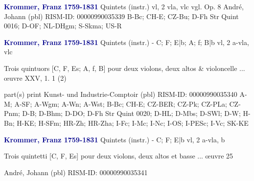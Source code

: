 \documentclass[twocolumn]{book}
\begin{document}
\newline \par \vspace{7pt} \textcolor{darkblue}{\textbf{Krommer, Franz  1759-1831}}
\newline Quintets (instr.)
 vl, 2 vla, vlc
\newline vgl. Op. 8
\newline André, Johann  (pbl)
\newline RISM-ID: 00000990035339
\newline B-Bc; CH-E; CZ-Bu; D-Fh  Str Quint 0016; D-OF; NL-DHgm; S-Skma; US-R
\newline \par \vspace{7pt} \textcolor{darkblue}{\textbf{Krommer, Franz  1759-1831}}
\newline Quintets (instr.) - C; F; E|b; A; f; B|b
 vl, 2 a-vla, vlc
\newline \begin{itshape}Trois quintuors [C, F, Es; A, f, B] pour deux violons, deux altos \& violoncelle ... œuvre XXV, 1. 1 (2)\end{itshape} 
\newline \textcolor{darkblue}{}  part(s)
\newline print
\newline Kunst- und Industrie-Comptoir  (pbl)
\newline RISM-ID: 00000990035340
\newline A-M; A-SF; A-Wgm; A-Wn; A-Wst; B-Bc; CH-E; CZ-BER; CZ-Pk; CZ-PLa; CZ-Pnm; D-B; D-Bhm; D-DO; D-Fh  Str Quint 0020; D-HL; D-Mbs; D-SWl; D-W; H-Bn; H-KE; H-SFm; HR-Zh; HR-Zha; I-Fc; I-Mc; I-Nc; I-OS; I-PESc; I-Vc; SK-KE
\newline \par \vspace{7pt} \textcolor{darkblue}{\textbf{Krommer, Franz  1759-1831}}
\newline Quintets (instr.) - C; F; E|b
 vl, 2 a-vla, b
\newline \begin{itshape}Trois quintetti [C, F, Es] pour deux violons, deux altos et basse ... œuvre 25\end{itshape} 
\newline André, Johann  (pbl)
\newline RISM-ID: 00000990035341
\end{document}
